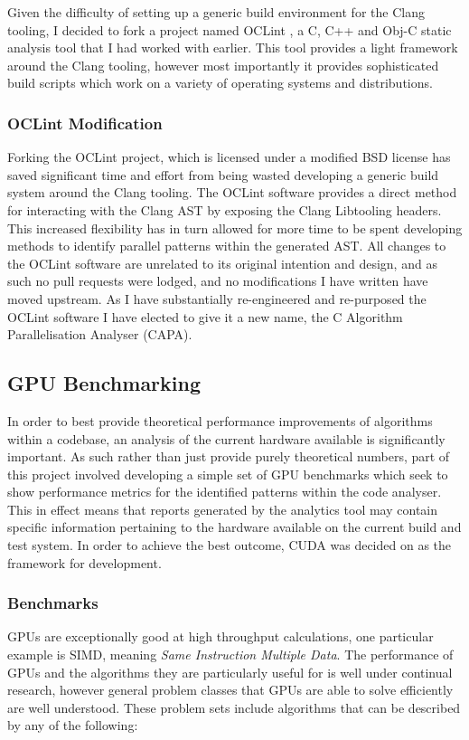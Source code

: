 Given the difficulty of setting up a generic build environment for the Clang tooling, I decided to
fork a project named OCLint \cite{oclint}, a C, C++ and Obj-C static analysis tool that I had worked with earlier.
This tool provides a light framework around the Clang tooling, however most importantly it provides
sophisticated build scripts which work on a variety of operating systems and distributions.

\subsubsection{OCLint Modification} 
Forking the OCLint project, which is licensed under a modified
BSD license has saved significant time and effort from being wasted developing a generic build
system around the Clang tooling. The OCLint software provides a direct method for interacting with
the Clang AST by exposing the Clang Libtooling headers. This increased flexibility has in turn
allowed for more time to be spent developing methods to identify parallel patterns within the
generated AST. All changes to the OCLint software are unrelated to its original
intention and design, and as such no pull requests were lodged, and no modifications I
have written have moved upstream. As I have substantially re-engineered and re-purposed the OCLint
software I have elected to give it a new name, the C Algorithm Parallelisation Analyser (CAPA).

\subsection{GPU Benchmarking}
In order to best provide theoretical performance improvements of
algorithms within a codebase, an analysis of the current hardware available is significantly
important. As such rather than just provide purely theoretical numbers, part of this project
involved developing a simple set of GPU benchmarks which seek to show performance metrics for the
identified patterns within the code analyser. This in effect means that reports generated by the
analytics tool may contain specific information pertaining to the hardware available on the current
build and test system. In order to achieve the best outcome, CUDA was decided on as the framework
for development.

\subsubsection{Benchmarks}
GPUs are exceptionally good at high throughput calculations, one
particular example is SIMD, meaning \emph{Same Instruction Multiple Data}. The performance of GPUs
and the algorithms they are particularly useful for is well under continual research, however
general problem classes that GPUs are able to solve efficiently are well understood. These problem
sets include algorithms that can be described by any of the following:

